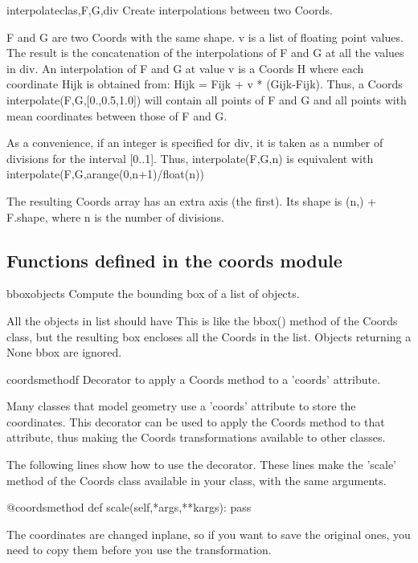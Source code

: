 \begin{funcdesc}{interpolate}{clas,F,G,div}
Create interpolations between two Coords.

        F and G are two Coords with the same shape.
        v is a list of floating point values.
        The result is the concatenation of the interpolations of F and G at all
        the values in div.
        An interpolation of F and G at value v is a Coords H where each
        coordinate Hijk is obtained from:  Hijk = Fijk + v * (Gijk-Fijk).
        Thus, a Coords interpolate(F,G,[0.,0.5,1.0]) will contain all points of
        F and G and all points with mean coordinates between those of F and G.

        As a convenience, if an integer is specified for div, it is taken as a
        number of divisions for the interval [0..1].
        Thus, interpolate(F,G,n) is equivalent with
        interpolate(F,G,arange(0,n+1)/float(n))

        The resulting Coords array has an extra axis (the first). Its shape is
        (n,) + F.shape, where n is the number of divisions.
        
\classmethod
\end{funcdesc}


\subsection{Functions defined in the coords module}



\begin{funcdesc}{bbox}{objects}
Compute the bounding box of a list of objects.

    All the objects in list should have
    This is like the bbox() method of the Coords class, but the resulting
    box encloses all the Coords in the list.
    Objects returning a None bbox are ignored.
    

\end{funcdesc}


\begin{funcdesc}{coordsmethod}{f}
Decorator to apply a Coords method to a 'coords' attribute.

    Many classes that model geometry use a 'coords' attribute to store
    the coordinates. This decorator can be used to apply the Coords method
    to that attribute, thus making the Coords transformations available
    to other classes.

    The following lines show how to use the decorator.
    These lines make the 'scale' method of the Coords class available in
    your class, with the same arguments.
    
    @coordsmethod
    def scale(self,*args,**kargs):
        pass
    
    The coordinates are changed inplane, so if you want to save the original
    ones, you need to copy them before you use the transformation.
    

\end{funcdesc}



